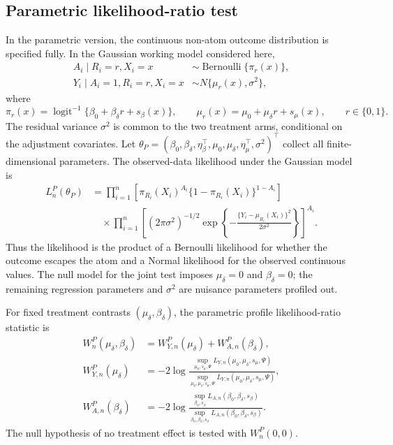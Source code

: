 \documentclass[11pt]{article}
\DeclareMathOperator*{\logit}{logit}
\DeclareMathOperator*{\Bernoulli}{Bernoulli}
\begin{document}
\subsection{Parametric likelihood-ratio test}

In the parametric version, the continuous non-atom outcome distribution is specified fully. In the Gaussian working model considered here,
\begin{align*}
  A_i \mid R_i = r, X_i = x
  &\sim \Bernoulli\{\pi_r(x)\},\\
  Y_i \mid A_i = 1, R_i = r, X_i = x
  &\sim N\{\mu_r(x),\sigma^2\},
\end{align*}
where
\[
  \pi_r(x)
  =
  \logit^{-1}\{\beta_0 + \beta_\delta r + s_\beta(x)\},
  \qquad
  \mu_r(x)
  =
  \mu_0 + \mu_\delta r + s_\mu(x),
  \qquad r \in \{0,1\}.
\]
The residual variance $\sigma^2$ is common to the two treatment arms, conditional on the adjustment covariates. Let $\theta_P = (\beta_0,\beta_\delta,\eta_\beta^\top,\mu_0,\mu_\delta,\eta_\mu^\top,\sigma^2)^\top$ collect all finite-dimensional parameters. The observed-data likelihood under the Gaussian model is
\begin{align*}
  L_n^P(\theta_P)
  &=
  \prod_{i = 1}^n
  \left[
    \pi_{R_i}(X_i)^{A_i}
    \{1-\pi_{R_i}(X_i)\}^{1-A_i}
  \right]\\
  &\quad \times
  \prod_{i = 1}^n
  \left[
    (2\pi\sigma^2)^{-1/2}
    \exp\left\{-\frac{\{Y_i-\mu_{R_i}(X_i)\}^2}{2\sigma^2}\right\}
  \right]^{A_i}.
\end{align*}
Thus the likelihood is the product of a Bernoulli likelihood for whether the outcome escapes the atom and a Normal likelihood for the observed continuous values. The null model for the joint test imposes $\mu_\delta = 0$ and $\beta_\delta = 0$; the remaining regression parameters and $\sigma^2$ are nuisance parameters profiled out.

For fixed treatment contrasts $(\mu_\delta,\beta_\delta)$, the parametric profile likelihood-ratio statistic is
\begin{equation}
\label{eq:LRTtotal}
\begin{aligned}
  W_n^P(\mu_\delta, \beta_\delta)
  &= W_{Y,n}^P(\mu_\delta) + W_{A,n}^P(\beta_\delta),\\
  W_{Y,n}^P(\mu_\delta)
  &= -2\log \frac{\sup\limits_{\mu_0, s_\mu, \Psi} L_{Y,n}(\mu_0, \mu_\delta, s_\mu, \Psi)}
  {\sup\limits_{\mu_0, \mu_\delta, s_\mu, \Psi} L_{Y,n}(\mu_0, \mu_\delta, s_\mu, \Psi)},\\
  W_{A,n}^P(\beta_\delta)
  &= -2\log \frac{\sup\limits_{\beta_0, s_\beta} L_{A,n}(\beta_0, \beta_\delta, s_\beta)}
  {\sup\limits_{\beta_0, \beta_\delta, s_\beta} L_{A,n}(\beta_0, \beta_\delta, s_\beta)}.
\end{aligned}
\end{equation}
The null hypothesis of no treatment effect is tested with $W_n^P(0,0)$.
\end{document}
